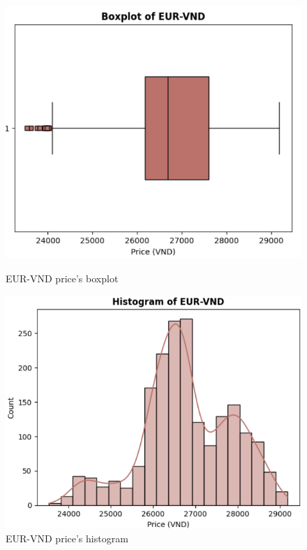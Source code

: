 \documentclass{ieeeojies}
\begin{document}
\begin{figure}[H]
    \centering
    \begin{minipage}{0.23\textwidth}
    \centering
    \includegraphics[width=1\textwidth]{Descriptive_statistic/eur_boxplot.png}
    \caption{EUR-VND price's boxplot}
    \label{fig:1}
    \end{minipage}
    \hfill
    \begin{minipage}{0.23\textwidth}
    \centering
    \includegraphics[width=1\textwidth]{Descriptive_statistic/eur_histogram.png}
    \caption{EUR-VND price's histogram}
    \label{fig:2}
    \end{minipage}
\end{figure}
\end{document}
